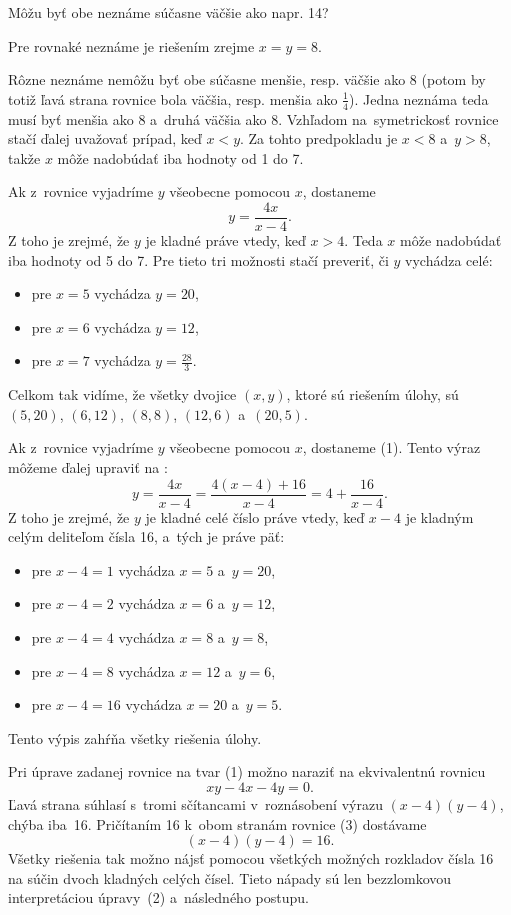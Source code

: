 {%
\napad
Môžu byť obe neznáme súčasne väčšie ako napr. 14?

\riesenie
Pre rovnaké neznáme je riešením zrejme $x=y=8$.

Rôzne neznáme nemôžu byť obe súčasne menšie, resp. väčšie ako 8 (potom by totiž ľavá strana rovnice bola väčšia, resp. menšia ako $\frac14$).
Jedna neznáma teda musí byť menšia ako 8 a~druhá väčšia ako 8.
Vzhľadom na~symetrickosť rovnice stačí ďalej uvažovať prípad, keď $x<y$.
Za tohto predpokladu je $x<8$ a~$y>8$,
takže $x$ môže nadobúdať iba hodnoty od 1 do 7.

Ak z~rovnice vyjadríme $y$ všeobecne pomocou $x$, dostaneme
$$
y=\frac{4x}{x-4}. \tag{1}
$$
Z toho je zrejmé, že $y$ je kladné práve vtedy, keď $x>4$.
Teda $x$ môže nadobúdať iba hodnoty od 5 do 7.
Pre tieto tri možnosti stačí preveriť, či $y$ vychádza celé:
\begin{itemize}
\item pre $x=5$ vychádza $y=20$,
\item pre $x=6$ vychádza $y=12$,
\item pre $x=7$ vychádza $y=\frac{28}{3}$.
\end{itemize}

Celkom tak vidíme, že všetky dvojice $(x,y)$, ktoré sú riešením úlohy, sú $(5,20)$, $(6,12)$, $(8,8)$, $(12,6)$ a~$(20,5)$.

\ineriesenie
Ak z~rovnice vyjadríme $y$ všeobecne pomocou $x$, dostaneme (1).
Tento výraz môžeme ďalej upraviť na :
$$
y=\frac{4x}{x-4}=\frac{4(x-4)+16}{x-4}=4+\frac{16}{x-4}. \tag{2}
$$
Z toho je zrejmé, že $y$ je kladné celé číslo práve vtedy, keď $x-4$ je kladným celým deliteľom čísla 16, a~tých je práve päť:
\begin{itemize}
\item pre $x-4=1$ vychádza $x=5$ a~$y=20$,
\item pre $x-4=2$ vychádza $x=6$ a~$y=12$,
\item pre $x-4=4$ vychádza $x=8$ a~$y=8$,
\item pre $x-4=8$ vychádza $x=12$ a~$y=6$,
\item pre $x-4=16$ vychádza $x=20$ a~$y=5$.
\end{itemize}
Tento výpis zahŕňa všetky riešenia úlohy.

\poznamka
Pri úprave zadanej rovnice na tvar (1) možno naraziť na ekvivalentnú rovnicu
$$
xy-4x-4y=0. \tag{3}
$$
Ľavá strana súhlasí s~tromi sčítancami v~roznásobení výrazu $(x-4)(y-4)$, chýba iba~16.
Pričítaním 16 k~obom stranám rovnice (3) dostávame
$$
(x-4)(y-4)=16.
$$
Všetky riešenia tak možno nájsť pomocou všetkých možných rozkladov čísla 16 na súčin dvoch kladných celých čísel.
Tieto nápady sú len bezzlomkovou interpretáciou úpravy~(2) a~následného postupu.
}

